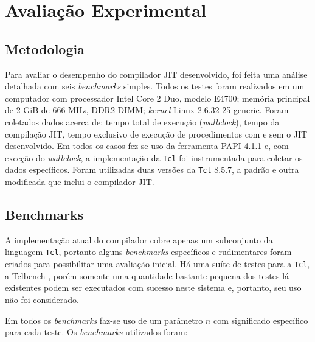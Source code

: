 \chapter{Avaliação Experimental}
\label{avaliacao}

\section{Metodologia}
\label{sec:metodologia}


Para avaliar o desempenho do compilador JIT desenvolvido, foi feita uma
análise detalhada com seis \textit{benchmarks} simples. Todos os
testes foram realizados em um computador com processador Intel Core 2
Duo, modelo E4700; memória principal de 2 GiB de 666 MHz, DDR2 DIMM;
\textit{kernel} Linux 2.6.32-25-generic. Foram coletados dados acerca
de: tempo total de execução (\textit{wallclock}),
tempo da compilação JIT, tempo exclusivo de execução de procedimentos
com e sem o JIT desenvolvido.
Em todos os casos fez-se uso da ferramenta PAPI \cite{papisite}
 4.1.1 e,
com exceção do \textit{wallclock}, a implementação da \texttt{Tcl} foi
instrumentada para coletar os dados específicos. Foram utilizadas duas
versões da \texttt{Tcl} 8.5.7, a padrão e outra modificada que inclui
o compilador JIT.

\section{Benchmarks}

A implementação atual do compilador cobre apenas um subconjunto
da linguagem \texttt{Tcl}, portanto alguns \textit{benchmarks}
específicos e rudimentares foram criados para possibilitar
uma avaliação inicial. Há uma suíte de testes para a \texttt{Tcl}, a Tclbench
\cite{tclbench-site}, porém somente uma quantidade bastante pequena dos
testes lá existentes podem ser executados com sucesso neste sistema e,
portanto, seu uso não foi considerado.

Em todos os \textit{benchmarks} faz-se uso de um parâmetro $n$ com
significado específico para cada teste. Os \textit{benchmarks}
utilizados foram:

